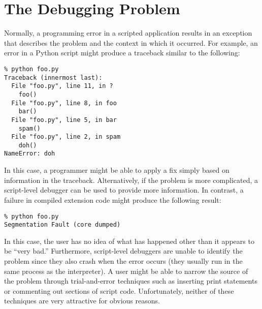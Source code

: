 \section{The Debugging Problem}

Normally, a programming error in a scripted application 
results in an exception that describes the problem and the context in
which it occurred.  For example, an error in a Python script might
produce a traceback similar to the following:

\begin{verbatim}
% python foo.py
Traceback (innermost last):
  File "foo.py", line 11, in ?
    foo()
  File "foo.py", line 8, in foo
    bar()
  File "foo.py", line 5, in bar
    spam()
  File "foo.py", line 2, in spam
    doh()
NameError: doh
\end{verbatim}

In this case, a programmer might be able to apply a fix simply based
on information in the traceback.  Alternatively, if the problem is
more complicated, a script-level debugger can be used to provide more information.  In contrast,
a failure in compiled extension code might produce the following result:

\begin{verbatim}
% python foo.py
Segmentation Fault (core dumped)
\end{verbatim}

In this case, the user has no idea of what has happened other
than it appears to be ``very bad.'' Furthermore, script-level
debuggers are unable to identify the problem since they also crash
when the error occurs (they usually run in the same process as
the interpreter).  A user might be able to narrow the source of the
problem through trial-and-error techniques such as inserting print
statements or commenting out sections of script code.  Unfortunately,
neither of these techniques are very attractive for obvious reasons.

